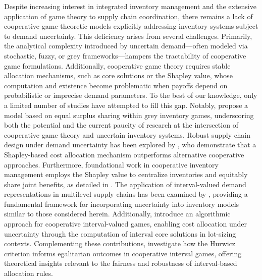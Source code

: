\documentclass[12pt]{article}
\begin{document}
\noindent Despite increasing interest in integrated inventory management and the extensive application of game theory to supply chain coordination, there remains a lack of cooperative game-theoretic models explicitly addressing inventory systems subject to demand uncertainty. This deficiency arises from several challenges. Primarily, the analytical complexity introduced by uncertain demand—often modeled via stochastic, fuzzy, or grey frameworks—hampers the tractability of cooperative game formulations. Additionally, cooperative game theory requires stable allocation mechanisms, such as core solutions or the Shapley value, whose computation and existence become problematic when payoffs depend on probabilistic or imprecise demand parameters. To the best of our knowledge, only a limited number of studies have attempted to fill this gap. Notably, \cite{Donmez2024} propose a model based on equal surplus sharing within grey inventory games, underscoring both the potential and the current paucity of research at the intersection of cooperative game theory and uncertain inventory systems. Robust supply chain design under demand uncertainty has been explored by \cite{Gomez2024}, who demonstrate that a Shapley-based cost allocation mechanism outperforms alternative cooperative approaches. Furthermore, foundational work in cooperative inventory management employs the Shapley value to centralize inventories and equitably share joint benefits, as detailed in \cite{Dror2002}. The application of interval-valued demand representations in multilevel supply chains has been examined by \cite{Bai2017}, providing a fundamental framework for incorporating uncertainty into inventory models similar to those considered herein. Additionally, \cite{Kimms2009} introduce an algorithmic approach for cooperative interval-valued games, enabling cost allocation under uncertainty through the computation of interval core solutions in lot-sizing contexts. Complementing these contributions, \cite{Alparslan2019Hurwicz} investigate how the Hurwicz criterion informs egalitarian outcomes in cooperative interval games, offering theoretical insights relevant to the fairness and robustness of interval-based allocation rules.
\end{document}
